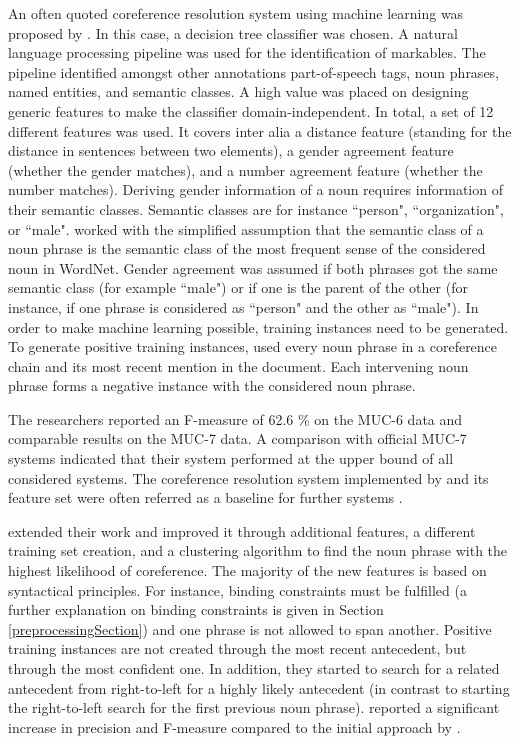 An often quoted coreference resolution system using machine learning was proposed by \cite{soon2001machine}. In this case, a decision tree classifier was chosen. A natural language processing pipeline was used for the identification of markables. The pipeline identified amongst other annotations part-of-speech tags, noun phrases, named entities, and semantic classes. A high value was placed on designing generic features to make the classifier domain-independent. In total, a set of 12 different features was used. It covers inter alia a distance feature (standing for the distance in sentences between two elements), a gender agreement feature (whether the gender matches), and a number agreement feature (whether the number matches). Deriving gender information of a noun requires information of their semantic classes. Semantic classes are for instance ``person", ``organization", or ``male". \cite{soon2001machine} worked with the simplified assumption that the semantic class of a noun phrase is the semantic class of the most frequent sense of the considered noun in WordNet. Gender agreement was assumed if both phrases got the same semantic class (for example ``male") or if one is the parent of the other (for instance, if one phrase is considered as ``person" and the other as ``male"). 
In order to make machine learning possible, training instances need to be generated.\\
To generate positive training instances, \cite{soon2001machine} used every noun phrase in a coreference chain and its most recent mention in the document. Each intervening noun phrase forms a negative instance with the considered noun phrase. 

The researchers reported an F-measure of 62.6 \% on the MUC-6 data and comparable results on the MUC-7 data. A comparison with official MUC-7 systems indicated that their system performed at the upper bound of all considered systems. The coreference resolution system implemented by \cite{soon2001machine} and its feature set were often referred as a baseline for further systems \citep{versley2008bart}.

\cite{ng2002improving} extended their work and improved it through additional features, a different training set creation, and a clustering algorithm to find the noun phrase with the highest likelihood of coreference. The majority of the new features is based on syntactical principles. For instance, binding constraints must be fulfilled (a further explanation on binding constraints is given in Section \ref{preprocessingSection}) and one phrase is not allowed to span another. Positive training instances are not created through the most recent antecedent, but through the most confident one. In addition, they started to search for a related antecedent from right-to-left for a highly likely antecedent (in contrast to starting the right-to-left search for the first previous noun phrase). \cite{ng2002improving} reported a significant increase in precision and F-measure compared to the initial approach by \cite{soon2001machine}.

